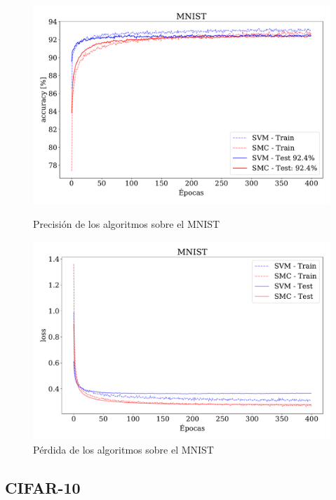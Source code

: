 \begin{figure}[H]
    \centering
    \begin{minipage}{.485\textwidth}
        \centering
        \includegraphics[width=\textwidth]{plots/ejer_5_MNIST_acc.pdf}
        \caption{Precisión de los algoritmos sobre el MNIST}
        \label{fig:ejer5_mnist_acc}
    \end{minipage}%
    \hfill
    \begin{minipage}{.485\textwidth}
        \centering
        \includegraphics[width=\textwidth]{plots/ejer_5_MNIST_los.pdf}
        \caption{Pérdida de los algoritmos sobre el MNIST}
        \label{fig:ejer5_mnist_loss}
    \end{minipage}
\end{figure}
    

\subsection*{CIFAR-10}

